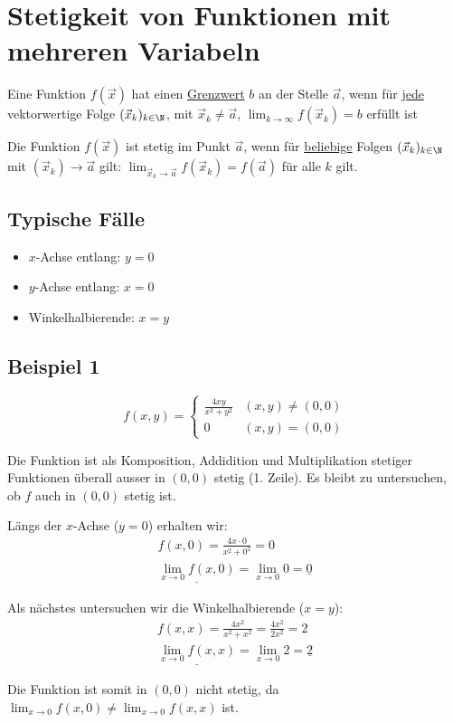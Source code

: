 \section{Stetigkeit von Funktionen mit mehreren Variabeln}
\begin{definition}[Grenzwert]
Eine Funktion $f(\vec{x})$ hat einen \underline{Grenzwert} $b$ an der Stelle
$\vec{a}$, wenn für \underline{jede} vektorwertige Folge $(\vec{x}_k)_{k \in \N}$,
mit $\vec{x}_k \neq \vec{a}$, $\lim_{k \to \infty}f(\vec{x}_k) = b$ erfüllt ist
\end{definition}
\begin{definition}[Stetigkeit]
Die Funktion $f(\vec{x})$ ist stetig im Punkt $\vec{a}$, wenn für
\underline{beliebige} Folgen $(\vec{x}_k)_{k \in \N}$ mit
$(\vec{x}_k) \to \vec{a}$ gilt: $\lim_{\vec{x}_k \to \vec{a}} f(\vec{x}_k) = f(\vec{a})$
für alle $k$ gilt.
\end{definition}

\subsection{Typische Fälle}
\begin{itemize}
	\item $x$-Achse entlang: $y = 0$
	\item $y$-Achse entlang: $x = 0$
	\item Winkelhalbierende: $x = y$
\end{itemize}

\subsection{Beispiel 1}
\[
f(x, y) = \begin{cases}
	\frac{4xy}{x^2 + y^2} & (x,y) \neq (0,0)\\
	0 & (x,y) = (0,0)
\end{cases}
\]

Die Funktion ist als Komposition, Addidition und Multiplikation stetiger
Funktionen überall ausser in $(0,0)$ stetig (1. Zeile). Es bleibt zu untersuchen,
ob $f$ auch in $(0,0)$ stetig ist.

Längs der $x$-Achse ($y = 0$) erhalten wir:
\begin{align*}
f(x, 0) = \frac{4x \cdot 0}{x^2 + 0^2} = 0\\
\underline{\lim_{x \to 0} f(x, 0)} = \lim_{x \to 0} 0 = \underline{0}
\end{align*}

Als nächstes untersuchen wir die Winkelhalbierende ($x = y$):
\begin{align*}
f(x, x) = \frac{4x^2}{x^2 + x^2} = \frac{4x^2}{2x^2} = 2\\
\underline{\lim_{x \to 0} f(x, x)} = \lim_{x \to 0} 2 = \underline{2}
\end{align*}

Die Funktion ist somit in $(0,0)$ nicht stetig, da
$\lim_{x \to 0} f(x, 0) \neq \lim_{x \to 0} f(x, x)$ ist.
